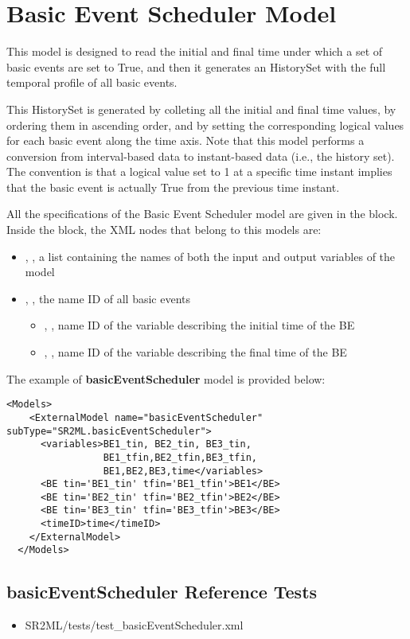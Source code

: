 \section{Basic Event Scheduler Model}
\label{sec:basicEventScheduler}

This model is designed to read the initial and final time under which a set of basic events
are set to True, and then it generates an HistorySet with the full temporal profile of all
basic events.

This HistorySet is generated by colleting all the initial and final time values, by ordering 
them in ascending order, and by setting the corresponding logical values for each basic event 
along the time axis.
Note that this model performs a conversion from interval-based data to instant-based data 
(i.e., the history set). The convention is that a logical value set to 1 at a specific time 
instant implies that the basic event is actually True from the previous time instant.

All the specifications of the Basic Event Scheduler model are given in the  block.
Inside the  block, the XML
nodes that belong to this models are:
\begin{itemize}
  \item  {}, , a list containing the names of both the input and output variables of the model
  \item  {}, , the name ID of all basic events
	  \begin{itemize}
	    \item {}, , name ID of the variable describing the initial time of the BE
	    \item {}, , name ID of the variable describing the final time of the BE
	  \end{itemize}
\end{itemize}

The example of \textbf{basicEventScheduler} model is provided below:
\begin{lstlisting}[style=XML]
  <Models>
    <ExternalModel name="basicEventScheduler" subType="SR2ML.basicEventScheduler">
      <variables>BE1_tin, BE2_tin, BE3_tin,
                 BE1_tfin,BE2_tfin,BE3_tfin,
                 BE1,BE2,BE3,time</variables>
      <BE tin='BE1_tin' tfin='BE1_tfin'>BE1</BE>
      <BE tin='BE2_tin' tfin='BE2_tfin'>BE2</BE>
      <BE tin='BE3_tin' tfin='BE3_tfin'>BE3</BE>
      <timeID>time</timeID>
    </ExternalModel>
  </Models>
\end{lstlisting}

\subsection{basicEventScheduler Reference Tests}
\begin{itemize}
	\item SR2ML/tests/test\_basicEventScheduler.xml
\end{itemize}



